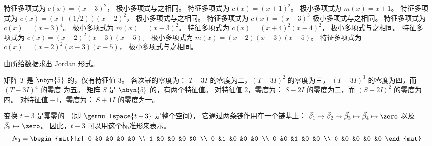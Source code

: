 \begin{exercises}
\begin{answer}
      \begin{exparts}
        \partsitem 特征多项式为 $c(x)=(x-3)^2$，
          极小多项式与之相同。
        \partsitem 特征多项式为 $c(x)=(x+1)^2$。
          极小多项式为 $m(x)=x+1$。
        \partsitem 特征多项式为 
          $c(x)=(x+(1/2))(x-2)^2$，
          极小多项式与之相同。
        \partsitem 特征多项式为 $c(x)=(x-3)^3$
          极小多项式与之相同。
        \partsitem 特征多项式为 $c(x)=(x-3)^4$。
          极小多项式为 $m(x)=(x-3)^2$。
        \partsitem 特征多项式为 $c(x)=(x+4)^2(x-4)^2$，
          极小多项式与之相同。
        \partsitem 特征多项式为 
          $c(x)=(x-2)^2(x-3)(x-5)$，
          极小多项式为 $m(x)=(x-2)(x-3)(x-5)$。
        \partsitem 特征多项式为 
          $c(x)=(x-2)^2(x-3)(x-5)$，
          极小多项式与之相同。
      \end{exparts}
    \end{answer}
  \recommended \item
    由所给数据求出 Jordan 形式。
    \begin{exparts}
       \partsitem 矩阵 
         \( T \) 是 \( \nbyn{5} \) 的，仅有特征值 $3$。
         各次幂的零度为：
         \( T-3I \) 的零度为二，\( (T-3I)^2 \) 的零度为三，
         \( (T-3I)^3 \) 的零度为四，而 \( (T-3I)^4 \) 的零度
         为五。
       \partsitem 矩阵 \( S \) 是 \( \nbyn{5} \) 的，有两个特征值。
         对特征值 $2$，零度为：
         \( S-2I \) 的零度为二，而 \( (S-2I)^2 \) 的零度为四。
         对特征值 $-1$，零度为：
         \( S+1I \) 的零度为一。
    \end{exparts}
    \begin{answer}
      \begin{exparts}
         \partsitem 变换 $t-3$ 是幂零的
          （即 $\gennullspace{t-3}$ 是整个空间），
          它通过两条链作用在一个链基上：
          $\vec{\beta}_1\mapsto\vec{\beta}_2\mapsto\vec{\beta}_3
            \mapsto\vec{\beta}_4\mapsto\zero$
          以及 $\vec{\beta}_5\mapsto\zero$。
          因此，$t-3$ 可以用这个标准形来表示。
          \begin{equation*}
            N_3=
            \begin{mat}[r]
               0  &0  &0  &0  &0  \\
               1  &0  &0  &0  &0  \\
               0  &1  &0  &0  &0  \\
               0  &0  &1  &0  &0  \\
               0  &0  &0  &0  &0
             \end{mat}

\end{equation*}
\end{exparts}
\end{answer}
\end{exercises}
